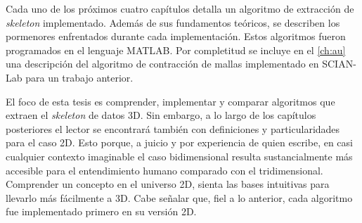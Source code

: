Cada uno de los próximos cuatro capítulos detalla un algoritmo de extracción de \textit{skeleton} implementado. Además de sus fundamentos teóricos, se describen los pormenores enfrentados durante cada implementación. Estos algoritmos fueron programados en el lenguaje MATLAB. Por completitud se incluye en el \autoref{ch:au} una descripción del algoritmo de contracción de mallas implementado en SCIAN-Lab para un trabajo anterior.

El foco de esta tesis es comprender, implementar y comparar algoritmos que extraen el \textit{skeleton} de datos 3D. Sin embargo, a lo largo de los capítulos posteriores el lector se encontrará también con definiciones y particularidades para el caso 2D. Esto porque, a juicio y por experiencia de quien escribe, en casi cualquier contexto imaginable el caso bidimensional resulta sustancialmente más accesible para el entendimiento humano comparado con el tridimensional. Comprender un concepto en el universo 2D, sienta las bases intuitivas para llevarlo más fácilmente a 3D. Cabe señalar que, fiel a lo anterior, cada algoritmo fue implementado primero en su versión 2D.
